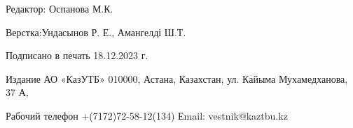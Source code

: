 \newpage

\thispagestyle{empty}
\null
\vfill
\begin{center}
Редактор: Оспанова М.К.

Верстка:Ундасынов Р. Е., Амангелді Ш.Т.

Подписано в печать 18.12.2023 г.

Издание АО «КазУТБ» 010000, Астана, Казахстан, ул. Кайыма Мухамедханова, 37 А,

Рабочий телефон +(7172)72-58-12(134) Еmail: vestnik@kaztbu.kz
\end{center}
\vfill
\null
